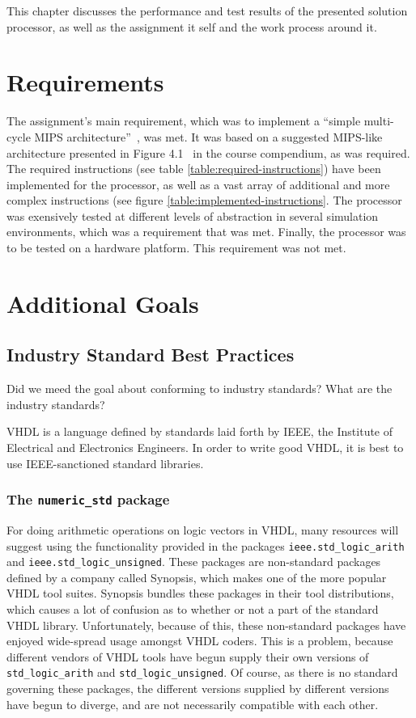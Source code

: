 This chapter discusses the performance and test results of the presented solution processor, as well as the assignment it self and the work process around it.

\section{Requirements}

The assignment's main requirement, which was to implement a ``simple multi-cycle MIPS architecture''~\cite[p.114]{compendium}, was met.
It was based on a suggested MIPS-like architecture presented in Figure 4.1~\cite[p.115]{compendium} in the course compendium, as was required.
The required instructions (see table \vref{table:required-instructions}) have been implemented for the processor, as well as a vast array of additional and more complex instructions (see figure \vref{table:implemented-instructions}.
The processor was exensively tested at different levels of abstraction in several simulation environments, which was a requirement that was met.
Finally, the processor was to be tested on a hardware platform.
This requirement was not met.

\section{Additional Goals}

\subsection{Industry Standard Best Practices}

Did we meed the goal about conforming to industry standards?
What are the industry standards?

VHDL is a language defined by standards laid forth by IEEE, the Institute of Electrical and Electronics Engineers.
In order to write good VHDL, it is best to use IEEE-sanctioned standard libraries.

\subsubsection{The \texttt{numeric\_std} package~\cite{why-library-numericstd-is-preferred}} \label{sec:numeric-std}

For doing arithmetic operations on logic vectors in VHDL, many resources will suggest using the functionality provided in the packages \texttt{ieee.std\_logic\_arith} and \texttt{ieee.std\_logic\_unsigned}.
These packages are non-standard packages defined by a company called Synopsis, which makes one of the more popular VHDL tool suites.
Synopsis bundles these packages in their tool distributions, which causes a lot of confusion as to whether or not a part of the standard VHDL library.
Unfortunately, because of this, these non-standard packages have enjoyed wide-spread usage amongst VHDL coders.
This is a problem, because different vendors of VHDL tools have begun supply their own versions of \texttt{std\_logic\_arith} and \texttt{std\_logic\_unsigned}.
Of course, as there is no standard governing these packages, the different versions supplied by different versions have begun to diverge, and are not necessarily compatible with each other.

